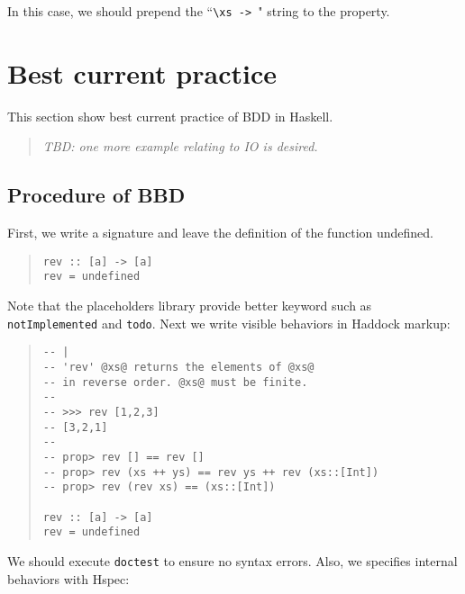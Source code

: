 \documentclass[preprint]{sigplanconf}
\newcommand{\hspec}{Hspec}
\begin{document}
\noindent In this case, we should prepend the ``\verb|\xs -> |" string
to the property.



\section{Best current practice}
\label{ref:Best-current-practice}

This section show best current practice of
BDD in Haskell.

\begin{quote}
    \emph{TBD: one more example relating to IO is desired.}
\end{quote}

\subsection{Procedure of BBD}

First, we write a signature and leave the definition of the function undefined.

\begin{quote}
\small
\begin{verbatim}
rev :: [a] -> [a]
rev = undefined
\end{verbatim}
\end{quote}

\noindent Note that the placeholders library provide better keyword such as {\tt notImplemented} and {\tt todo}.
Next we write visible behaviors in Haddock markup:

\begin{quote}
\small
\begin{verbatim}
-- |
-- 'rev' @xs@ returns the elements of @xs@
-- in reverse order. @xs@ must be finite.
--
-- >>> rev [1,2,3]
-- [3,2,1]
--
-- prop> rev [] == rev []
-- prop> rev (xs ++ ys) == rev ys ++ rev (xs::[Int])
-- prop> rev (rev xs) == (xs::[Int])

rev :: [a] -> [a]
rev = undefined
\end{verbatim}
\end{quote}

\noindent We should execute {\tt doctest} to ensure no syntax errors.
Also, we specifies internal behaviors with \hspec{}:
\end{document}

